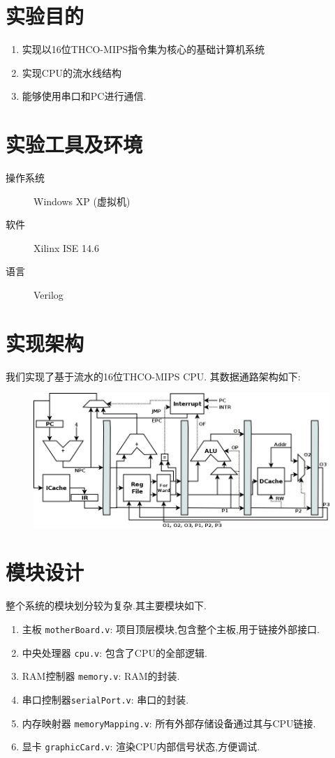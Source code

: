 
\section{实验目的}
\begin{enumerate}
  \item 实现以16位THCO-MIPS指令集为核心的基础计算机系统
  \item 实现CPU的流水线结构
  \item 能够使用串口和PC进行通信.
\end{enumerate}

\section{实验工具及环境}
\begin{description}
  \item[操作系统] Windows XP (虚拟机)
  \item[软件] Xilinx ISE 14.6
  \item[语言] Verilog
\end{description}

\section{实现架构}
我们实现了基于流水的16位THCO-MIPS CPU. 其数据通路架构如下:
\begin{figure}[H]
  \centering
  \includegraphics[width=\textwidth]{figure/mips.png}
\end{figure}

\section{模块设计}
整个系统的模块划分较为复杂.其主要模块如下.
\begin{enumerate}
  \item 主板 \verb|motherBoard.v|: 项目顶层模块,包含整个主板,用于链接外部接口.
  \item 中央处理器 \verb|cpu.v|: 包含了CPU的全部逻辑.
  \item RAM控制器 \verb|memory.v|: RAM的封装.
  \item 串口控制器\verb|serialPort.v|: 串口的封装.
  \item 内存映射器 \verb|memoryMapping.v|: 所有外部存储设备通过其与CPU链接.
  \item 显卡 \verb|graphicCard.v|: 渲染CPU内部信号状态,方便调试.
\end{enumerate}

